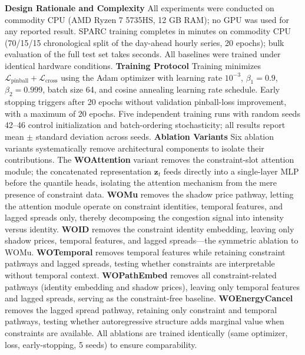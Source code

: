 \documentclass[twoside]{article}
\begin{document}
\textbf{Design Rationale and Complexity}
All experiments were conducted on commodity CPU (AMD Ryzen 7 5735HS, 12 GB RAM); no GPU was used for any reported result. SPARC training completes in minutes on commodity CPU (70/15/15 chronological split of the day-ahead hourly series, 20 epochs); bulk evaluation of the full test set takes seconds. All baselines were trained under identical hardware conditions.
\textbf{Training Protocol}
Training minimizes $\mathcal{L}_{\text{pinball}} + \mathcal{L}_{\text{cross}}$ using the Adam optimizer with learning rate $10^{-3}$, $\beta_1 = 0.9$, $\beta_2 = 0.999$, batch size 64, and cosine annealing learning rate schedule. Early stopping triggers after 20 epochs without validation pinball-loss improvement, with a maximum of 20 epochs. Five independent training runs with random seeds 42--46 control initialization and batch-ordering stochasticity; all results report mean $\pm$ standard deviation across seeds.
\textbf{Ablation Variants}
Six ablation variants systematically remove architectural components to isolate their contributions. The \textbf{WOAttention} variant removes the constraint-slot attention module; the concatenated representation $\mathbf{z}_t$ feeds directly into a single-layer MLP before the quantile heads, isolating the attention mechanism from the mere presence of constraint data. \textbf{WOMu} removes the shadow price pathway, letting the attention module operate on constraint identities, temporal features, and lagged spreads only, thereby decomposing the congestion signal into intensity versus identity. \textbf{WOID} removes the constraint identity embedding, leaving only shadow prices, temporal features, and lagged spreads---the symmetric ablation to WOMu. \textbf{WOTemporal} removes temporal features while retaining constraint pathways and lagged spreads, testing whether constraints are interpretable without temporal context. \textbf{WOPathEmbed} removes all constraint-related pathways (identity embedding and shadow prices), leaving only temporal features and lagged spreads, serving as the constraint-free baseline. \textbf{WOEnergyCancel} removes the lagged spread pathway, retaining only constraint and temporal pathways, testing whether autoregressive structure adds marginal value when constraints are available. All ablations are trained identically (same optimizer, loss, early-stopping, 5 seeds) to ensure comparability.
\end{document}

